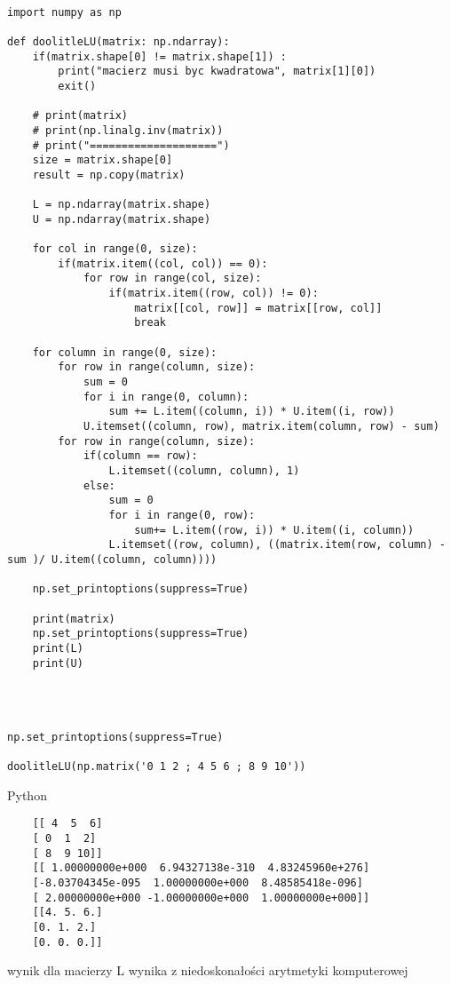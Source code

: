 \begin{verbatim}

import numpy as np 

def doolitleLU(matrix: np.ndarray):
    if(matrix.shape[0] != matrix.shape[1]) :
        print("macierz musi byc kwadratowa", matrix[1][0])
        exit()

    # print(matrix)
    # print(np.linalg.inv(matrix))
    # print("====================")
    size = matrix.shape[0]
    result = np.copy(matrix)

    L = np.ndarray(matrix.shape)
    U = np.ndarray(matrix.shape)

    for col in range(0, size):
        if(matrix.item((col, col)) == 0):
            for row in range(col, size):
                if(matrix.item((row, col)) != 0):
                    matrix[[col, row]] = matrix[[row, col]]
                    break

    for column in range(0, size):
        for row in range(column, size):
            sum = 0
            for i in range(0, column):
                sum += L.item((column, i)) * U.item((i, row))
            U.itemset((column, row), matrix.item(column, row) - sum)    
        for row in range(column, size):
            if(column == row):
                L.itemset((column, column), 1)
            else:
                sum = 0
                for i in range(0, row):
                    sum+= L.item((row, i)) * U.item((i, column))
                L.itemset((row, column), ((matrix.item(row, column) - sum )/ U.item((column, column))))    
    
    np.set_printoptions(suppress=True)

    print(matrix)
    np.set_printoptions(suppress=True)
    print(L)
    print(U)




np.set_printoptions(suppress=True)

doolitleLU(np.matrix('0 1 2 ; 4 5 6 ; 8 9 10'))  
\end{verbatim}{Python}

\begin{lstlisting}
	[[ 4  5  6]
	[ 0  1  2]
	[ 8  9 10]]
	[[ 1.00000000e+000  6.94327138e-310  4.83245960e+276]
	[-8.03704345e-095  1.00000000e+000  8.48585418e-096]
	[ 2.00000000e+000 -1.00000000e+000  1.00000000e+000]]
	[[4. 5. 6.]
	[0. 1. 2.]
	[0. 0. 0.]]
\end{lstlisting}

wynik dla macierzy L wynika z niedoskonałości arytmetyki komputerowej

